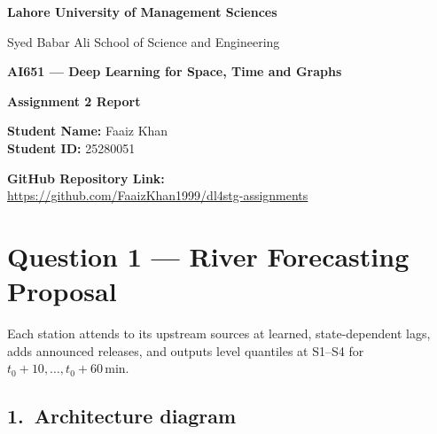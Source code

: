 \documentclass[11pt, a4paper]{article}
\begin{document}
\begin{titlepage}
    \centering
    \vspace*{2cm}
    
    {\LARGE \textbf{Lahore University of Management Sciences} \par}
    \vspace{0.5cm}
    {\Large Syed Babar Ali School of Science and Engineering \par}
    
    \vfill
    
    {\Large \textbf{AI651 --- Deep Learning for Space, Time and Graphs} \par}
    \vspace{1cm}
    {\Huge \textbf{Assignment 2 Report} \par}
    
    \vfill
    
    {\Large 
        \textbf{Student Name:} Faaiz Khan \\[0.2cm]
        \textbf{Student ID:} 25280051 
    \par}
    
    \vspace{1.5cm}
    
    {\large \textbf{GitHub Repository Link:}\\
    \vspace{0.2cm}
    \url{https://github.com/FaaizKhan1999/dl4stg-assignments} \par}
    
    \vspace*{2cm}
\end{titlepage}

\section*{Question 1 --- River Forecasting Proposal}

Each station attends to its upstream sources at learned, state-dependent lags, adds announced releases, and outputs level quantiles at S1--S4 for $t_0{+}10,\dots,t_0{+}60$\,min.

\subsection*{1.\ Architecture diagram}
\end{document}
